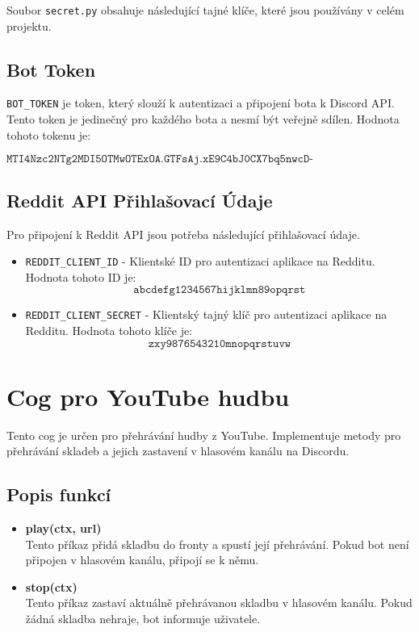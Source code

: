 \documentclass[12pt, a4paper]{report}
\begin{document}
Soubor \texttt{secret.py} obsahuje následující tajné klíče, které jsou používány v celém projektu.

\subsection{Bot Token}
\texttt{BOT\_TOKEN} je token, který slouží k autentizaci a připojení bota k Discord API. Tento token je jedinečný pro každého bota a nesmí být veřejně sdílen. Hodnota tohoto tokenu je:

\[
\texttt{MTI4Nzc2NTg2MDI5OTMwOTExOA.GTFsAj.xE9C4bJ0CX7bq5nwcD-v\_e2l1nq7pmtQOgC1Aw}
\]

\subsection{Reddit API Přihlašovací Údaje}
Pro připojení k Reddit API jsou potřeba následující přihlašovací údaje.

\begin{itemize}
    \item \texttt{REDDIT\_CLIENT\_ID} - Klientské ID pro autentizaci aplikace na Redditu. Hodnota tohoto ID je:
    \[
    \texttt{abcdefg1234567hijklmn89opqrst}
    \]
    
    \item \texttt{REDDIT\_CLIENT\_SECRET} - Klientský tajný klíč pro autentizaci aplikace na Redditu. Hodnota tohoto klíče je:
    \[
    \texttt{zxy9876543210mnopqrstuvw}
    \]
\end{itemize}



\section{Cog pro YouTube hudbu}

Tento cog je určen pro přehrávání hudby z YouTube. Implementuje metody pro přehrávání skladeb a jejich zastavení v hlasovém kanálu na Discordu.

\subsection{Popis funkcí}

\begin{itemize}
    \item \textbf{play(ctx, url)} \\
    Tento příkaz přidá skladbu do fronty a spustí její přehrávání. Pokud bot není připojen v hlasovém kanálu, připojí se k němu.
    
    \item \textbf{stop(ctx)} \\
    Tento příkaz zastaví aktuálně přehrávanou skladbu v hlasovém kanálu. Pokud žádná skladba nehraje, bot informuje uživatele.
\end{itemize}
\end{document}
